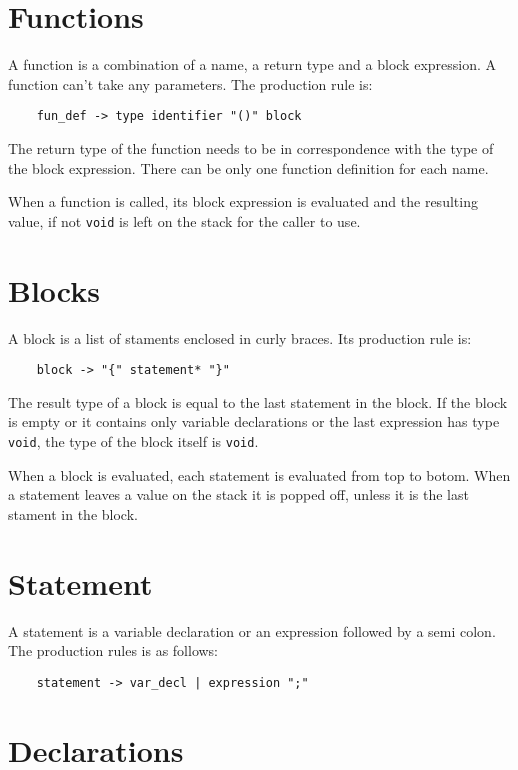 \documentclass{report}
\begin{document}
\section{Functions}

A function is a combination of a name, a return type and a block
expression. A function can't take any parameters. The production
rule is:

\begin{verbatim}
    fun_def -> type identifier "()" block
\end{verbatim}

The return type of the function needs to be in correspondence with
the type of the block expression. There can be only one function
definition for each name.

When a function is called, its block expression is evaluated and the
resulting value, if not \texttt{void} is left on the stack for the
caller to use.

\section{Blocks}

A block is a list of staments enclosed in curly braces. Its
production rule is:

\begin{verbatim}
    block -> "{" statement* "}"
\end{verbatim}

The result type of a block is equal to the last statement in the
block. If the block is empty or it contains only variable
declarations or the last expression has type \texttt{{{void}}}, the
type of the block itself is \texttt{void}.

When a block is evaluated, each statement is evaluated from top to
botom. When a statement leaves a value on the stack it is popped
off, unless it is the last stament in the block.

\section{Statement}

A statement is a variable declaration or an expression followed by a
semi colon. The production rules is as follows:

\begin{verbatim}
    statement -> var_decl | expression ";"
\end{verbatim}

\section{Declarations}
\end{document}
